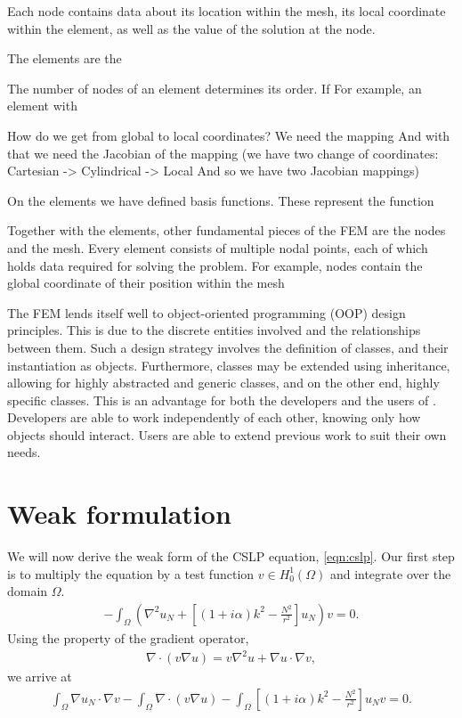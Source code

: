 Each node contains data about its location within the mesh, its local coordinate within the element, as well as the value of the solution at the node.

The elements are the 

The number of nodes of an element determines its order.
If For example, an element with

How do we get from global to local coordinates?
We need the mapping
And with that we need the Jacobian of the mapping
(we have two change of coordinates: Cartesian -> Cylindrical -> Local
And so we have two Jacobian mappings)

On the elements we have defined basis functions.
These represent the function 

Together with the elements, other fundamental pieces of the FEM are the nodes and the mesh.
Every element consists of multiple nodal points, each of which holds data required for solving the problem.
For example, nodes contain the global coordinate of their position within the mesh



The FEM lends itself well to object-oriented programming (OOP) design principles.
This is due to the discrete entities involved and the relationships between them.
Such a design strategy involves the definition of classes, and their instantiation as objects.
Furthermore, classes may be extended using inheritance, allowing for highly abstracted and generic classes, and on the other end, highly specific classes.
This is an advantage for both the developers and the users of \oomph.
Developers are able to work independently of each other, knowing only how objects should interact.
Users are able to extend previous work to suit their own needs.







\section{Weak formulation}

We will now derive the weak form of the CSLP equation, \eqref{eqn:cslp}.
Our first step is to multiply the equation by a test function $v\in H^1_0(\Omega)$ and integrate over the domain $\Omega$.
\begin{align}
	-\int_\Omega \left(\nabla^2 u_N + \left[ (1+i\alpha)k^2-\frac{N^2}{r^2}\right]u_N \right) v = 0.
\end{align}
Using the property of the gradient operator,
\begin{align}
	\nabla \cdot ( v \nabla u) = v \nabla^2 u + \nabla u \cdot \nabla v,
\end{align}
we arrive at
\begin{align}
	\int_\Omega \nabla u_N \cdot \nabla v 
  - \int_\Omega \nabla \cdot (v \nabla u ) 
  - \int_\Omega \left[(1+i\alpha)k^2 - \frac{N^2}{r^2}\right] u_N v = 0.
\end{align}

